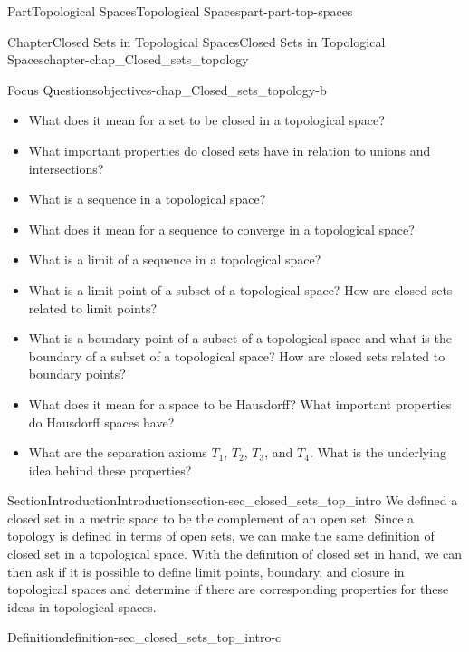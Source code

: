 \documentclass[oneside,10pt,]{book}
\numberwithin{equation}{chapter}
\begin{document}
\begin{partptx}{Part}{Topological Spaces}{}{Topological Spaces}{}{}{part-part-top-spaces}
%
\begin{chapterptx}{Chapter}{Closed Sets in Topological Spaces}{}{Closed Sets in Topological Spaces}{}{}{chapter-chap_Closed_sets_topology}
\renewcommand*{\chaptername}{Chapter}
\begin{objectives}{Focus Questions}{objectives-chap_Closed_sets_topology-b}
%
\begin{itemize}[label=\textbullet]
\item{}What does it mean for a set to be closed in a topological space?%
\item{}What important properties do closed sets have in relation to unions and intersections?%
\item{}What is a sequence in a topological space?%
\item{}What does it mean for a sequence to converge in a topological space?%
\item{}What is a limit of a sequence in a topological space?%
\item{}What is a limit point of a subset of a topological space? How are closed sets related to limit points?%
\item{}What is a boundary point of a subset of a topological space and what is the boundary of a subset of a topological space? How are closed sets related to boundary points?%
\item{}What does it mean for a space to be Hausdorff? What important properties do Hausdorff spaces have?%
\item{}What are the separation axioms \(T_1\), \(T_2\), \(T_3\), and \(T_4\). What is the underlying idea behind these properties?%
\end{itemize}
\end{objectives}
%
%
\typeout{************************************************}
\typeout{************************************************}
%
\begin{sectionptx}{Section}{Introduction}{}{Introduction}{}{}{section-sec_closed_sets_top_intro}
We defined a closed set in a metric space to be the complement of an open set. Since a topology is defined in terms of open sets, we can make the same definition of closed set in a topological space. With the definition of closed set in hand, we can then ask if it is possible to define limit points, boundary, and closure in topological spaces and determine if there are corresponding properties for these ideas in topological spaces.%
\begin{definition}{Definition}{}{definition-sec_closed_sets_top_intro-c}%

\end{definition}
\end{sectionptx}
\end{chapterptx}
\end{partptx}
\end{document}
